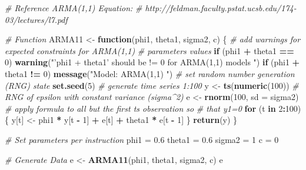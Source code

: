 \documentclass[openany]{book}
\newenvironment{Shaded}{\begin{snugshade}}{\end{snugshade}}
\newcommand{\CommentTok}[1]{\textcolor[rgb]{0.56,0.35,0.01}{\textit{#1}}}
\newcommand{\ControlFlowTok}[1]{\textcolor[rgb]{0.13,0.29,0.53}{\textbf{#1}}}
\newcommand{\DataTypeTok}[1]{\textcolor[rgb]{0.13,0.29,0.53}{#1}}
\newcommand{\DecValTok}[1]{\textcolor[rgb]{0.00,0.00,0.81}{#1}}
\newcommand{\FloatTok}[1]{\textcolor[rgb]{0.00,0.00,0.81}{#1}}
\newcommand{\KeywordTok}[1]{\textcolor[rgb]{0.13,0.29,0.53}{\textbf{#1}}}
\newcommand{\NormalTok}[1]{#1}
\newcommand{\OperatorTok}[1]{\textcolor[rgb]{0.81,0.36,0.00}{\textbf{#1}}}
\newcommand{\StringTok}[1]{\textcolor[rgb]{0.31,0.60,0.02}{#1}}
\begin{document}
\begin{Shaded}
\begin{Highlighting}[]
\CommentTok{# Reference ARMA(1,1) Equation:}
\CommentTok{# http://feldman.faculty.pstat.ucsb.edu/174-03/lectures/l7.pdf}

\CommentTok{# Function}
\NormalTok{ARMA11 <-}\StringTok{ }\ControlFlowTok{function}\NormalTok{(phi1, theta1, sigma2, c) \{}
  \CommentTok{# add warnings for expected constraints for ARMA(1,1)}
  \CommentTok{# parameters values}
  \ControlFlowTok{if}\NormalTok{ (phi1 }\OperatorTok{+}\StringTok{ }\NormalTok{theta1 }\OperatorTok{==}\StringTok{ }\DecValTok{0}\NormalTok{) }
    \KeywordTok{warning}\NormalTok{(}\StringTok{"'phi1 + theta1' should be != 0 for ARMA(1,1) models "}\NormalTok{)}
  \ControlFlowTok{if}\NormalTok{ (phi1 }\OperatorTok{+}\StringTok{ }\NormalTok{theta1 }\OperatorTok{!=}\StringTok{ }\DecValTok{0}\NormalTok{) }
    \KeywordTok{message}\NormalTok{(}\StringTok{"Model: ARMA(1,1) "}\NormalTok{)}
  \CommentTok{# set random number generation (RNG) state}
  \KeywordTok{set.seed}\NormalTok{(}\DecValTok{5}\NormalTok{)}
  \CommentTok{# generate time series 1:100}
\NormalTok{  y <-}\StringTok{ }\KeywordTok{ts}\NormalTok{(}\KeywordTok{numeric}\NormalTok{(}\DecValTok{100}\NormalTok{))}
  \CommentTok{# RNG of epsilon with constant variance (sigma^2)}
\NormalTok{  e <-}\StringTok{ }\KeywordTok{rnorm}\NormalTok{(}\DecValTok{100}\NormalTok{, }\DataTypeTok{sd =}\NormalTok{ sigma2)}
  \CommentTok{# apply formula to all but the first ts observation so}
  \CommentTok{# that y1=0}
  \ControlFlowTok{for}\NormalTok{ (t }\ControlFlowTok{in} \DecValTok{2}\OperatorTok{:}\DecValTok{100}\NormalTok{) \{}
\NormalTok{    y[t] <-}\StringTok{ }\NormalTok{phi1 }\OperatorTok{*}\StringTok{ }\NormalTok{y[t }\OperatorTok{-}\StringTok{ }\DecValTok{1}\NormalTok{] }\OperatorTok{+}\StringTok{ }\NormalTok{e[t] }\OperatorTok{+}\StringTok{ }\NormalTok{theta1 }\OperatorTok{*}\StringTok{ }\NormalTok{e[t }\OperatorTok{-}\StringTok{ }\DecValTok{1}\NormalTok{]}
\NormalTok{  \}}
  \KeywordTok{return}\NormalTok{(y)}
\NormalTok{\}}

\CommentTok{# Set parameters per instruction}
\NormalTok{phi1 =}\StringTok{ }\FloatTok{0.6}
\NormalTok{theta1 =}\StringTok{ }\FloatTok{0.6}
\NormalTok{sigma2 =}\StringTok{ }\DecValTok{1}
\NormalTok{c =}\StringTok{ }\DecValTok{0}

\CommentTok{# Generate Data}
\NormalTok{e <-}\StringTok{ }\KeywordTok{ARMA11}\NormalTok{(phi1, theta1, sigma2, c)}
\NormalTok{e}
\end{Highlighting}
\end{Shaded}
\end{document}

